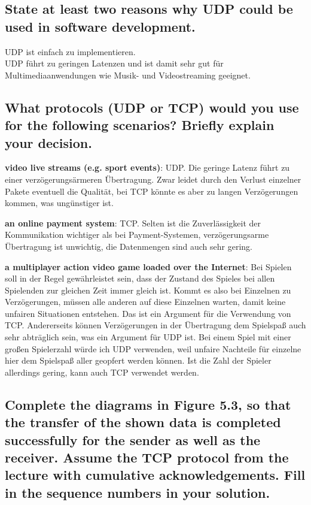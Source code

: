 \documentclass[a4paper,
			llpt,
			solution,
			accentcolor=tud2d,
			colorbacktitle
			]
			{tudexercise}
\begin{document}
\subsection{State at least two reasons why UDP could be used in software development.}
UDP ist einfach zu implementieren.\\
UDP führt zu geringen Latenzen und ist damit sehr gut für Multimediaanwendungen wie Musik- und Videostreaming geeignet.
\subsection{What protocols (UDP or TCP) would you use for the following scenarios? Briefly explain your decision.}
\begin{compactenum}
\item \textbf{video live streams (e.g. sport events)}: UDP. Die geringe Latenz führt zu einer verzögerungsärmeren Übertragung. Zwar leidet durch den Verlust einzelner Pakete eventuell die Qualität, bei TCP könnte es aber zu langen Verzögerungen kommen, was ungünstiger ist.
\item \textbf{an online payment system}: TCP. Selten ist die Zuverlässigkeit der Kommunikation wichtiger als bei Payment-Systemen, verzögerungsarme Übertragung ist unwichtig, die Datenmengen sind auch sehr gering.
\item \textbf{a multiplayer action video game loaded over the Internet}: Bei Spielen soll in der Regel gewährleistet sein, dass der Zustand des Spieles bei allen Spielenden zur gleichen Zeit immer gleich ist. Kommt es also bei Einzelnen zu Verzögerungen, müssen alle anderen auf diese Einzelnen warten, damit keine unfairen Situationen entstehen. Das ist ein Argument für die Verwendung von TCP. Andererseits können Verzögerungen in der Übertragung dem Spielspaß auch sehr abträglich sein, was ein Argument für UDP ist. Bei einem Spiel mit einer großen Spielerzahl würde ich UDP verwenden, weil unfaire Nachteile für einzelne hier dem Spielspaß aller geopfert werden können. Ist die Zahl der Spieler allerdings gering, kann auch TCP verwendet werden.
\end{compactenum}
\subsection{Complete the diagrams in Figure 5.3, so that the transfer of the shown data is completed successfully for the sender as well as the receiver. Assume the TCP protocol from the lecture with cumulative acknowledgements. Fill in the sequence numbers in your solution.}
\end{document}
